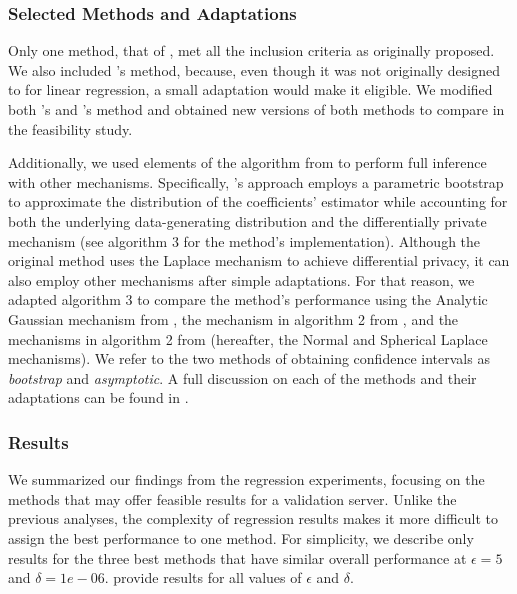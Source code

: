 \subsubsection{Selected Methods and Adaptations}\label{subsubsec:reg_meth}
Only one method, that of \citet{ferrando2020general}, met all the inclusion criteria as originally proposed. We also included \citet{brawner2018bootstrap}'s method, because, even though it was not originally designed to for linear regression, a small adaptation would make it eligible. We modified both \citet{ferrando2020general}'s and \citet{brawner2018bootstrap}'s method and obtained new versions of both methods to compare in the feasibility study. 

Additionally, we used elements of the algorithm from \citet{ferrando2020general} to perform full inference with other mechanisms. Specifically, \citet{ferrando2020general}'s approach employs a parametric bootstrap to approximate the distribution of the coefficients' estimator while accounting for both the underlying data-generating distribution and the differentially private mechanism (see algorithm 3 for the method's implementation). Although the original method uses the Laplace mechanism to achieve differential privacy, it can also employ other mechanisms after simple adaptations. For that reason, we adapted algorithm 3 to compare the method's performance using the Analytic Gaussian mechanism from \citet{balle2018improving}, the mechanism in algorithm 2 from \citet{sheffet2019old}, and the mechanisms in algorithm 2 from \citet{wang2019differentially} (hereafter, the Normal and Spherical Laplace mechanisms). We refer to the two methods of obtaining confidence intervals as \emph{bootstrap} and \emph{asymptotic}. A full discussion on each of the methods and their adaptations can be found in \citet{barrientos2021}.

\subsubsection{Results}

We summarized our findings from the regression experiments, focusing on the methods that may offer feasible results for a validation server. Unlike the previous analyses, the complexity of regression results makes it more difficult to assign the best performance to one method. For simplicity, we describe only results for the three best methods that have similar overall performance at $\epsilon = 5$ and $\delta = 1e-06$. \citet{barrientos2021} provide results for all values of $\epsilon$ and $\delta$.

